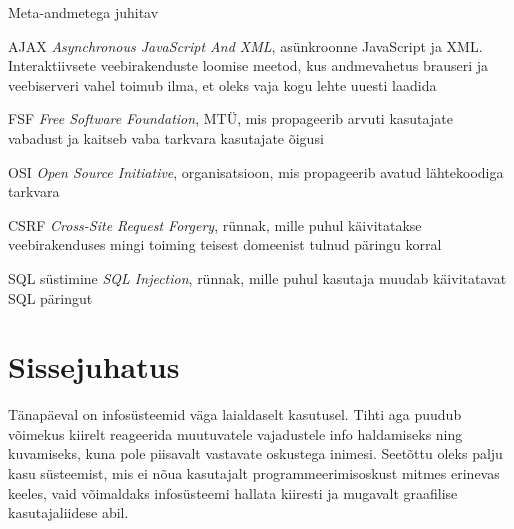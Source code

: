 \documentclass[a4paper,12pt]{article} %
\begin{document}
\begin{labeling}{Meta-andmetega juhitav}
\item [AJAX] \textit{Asynchronous JavaScript And XML}, asünkroonne JavaScript ja XML. Interaktiivsete veebirakenduste loomise meetod, kus andmevahetus brauseri ja veebiserveri vahel toimub ilma, et oleks vaja kogu lehte uuesti laadida \cite{Vallaste}
\item [FSF] \textit{Free Software Foundation}, MTÜ, mis propageerib arvuti kasutajate vabadust ja kaitseb vaba tarkvara kasutajate õigusi
\item [OSI] \textit{Open Source Initiative}, organisatsioon, mis propageerib avatud lähtekoodiga tarkvara
\item [CSRF] \textit{Cross-Site Request Forgery}, rünnak, mille puhul käivitatakse veebirakenduses mingi toiming teisest domeenist tulnud päringu korral
\item [SQL süstimine] \textit{SQL Injection}, rünnak, mille puhul kasutaja muudab käivitatavat SQL päringut
\end{labeling}
\pagebreak
\tableofcontents
\newpage
\listoffigures
\pagebreak
\listoftables
\pagebreak
\section{Sissejuhatus}
\label{Sissejuhatus} %
Tänapäeval on infosüsteemid väga laialdaselt kasutusel. Tihti aga puudub võimekus kiirelt reageerida muutuvatele vajadustele info haldamiseks ning kuvamiseks, kuna pole piisavalt vastavate oskustega inimesi. Seetõttu oleks palju kasu süsteemist, mis ei nõua kasutajalt programmeerimisoskust mitmes erinevas keeles, vaid võimaldaks infosüsteemi hallata kiiresti ja mugavalt graafilise kasutajaliidese abil.
\end{document}
